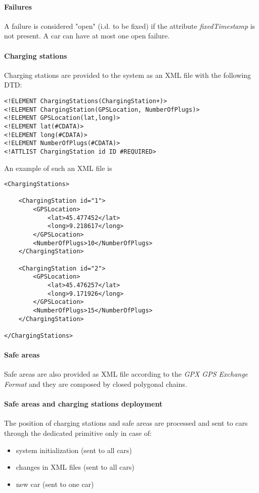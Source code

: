 \paragraph{Failures}A failure is considered "open" (i.d. to be fixed) if the attribute \emph{fixedTimestamp} is not present. A car can have at most one open failure.

\paragraph{Charging stations}Charging stations are provided to the system as an XML file with the following DTD:
\lstset{language=XML,frame=false}
\begin{lstlisting}
<!ELEMENT ChargingStations(ChargingStation+)>
<!ELEMENT ChargingStation(GPSLocation, NumberOfPlugs)>
<!ELEMENT GPSLocation(lat,long)>
<!ELEMENT lat(#CDATA)>
<!ELEMENT long(#CDATA)>
<!ELEMENT NumberOfPlugs(#CDATA)>
<!ATTLIST ChargingStation id ID #REQUIRED>
\end{lstlisting}
An example of such an XML file is 
\begin{lstlisting}
<ChargingStations>

	<ChargingStation id="1">
		<GPSLocation>
			<lat>45.477452</lat>
			<long>9.218617</long>
		</GPSLocation>
		<NumberOfPlugs>10</NumberOfPlugs>
	</ChargingStation>
	
	<ChargingStation id="2">
		<GPSLocation>
			<lat>45.476257</lat>
			<long>9.171926</long>
		</GPSLocation>
		<NumberOfPlugs>15</NumberOfPlugs>
	</ChargingStation>
	
</ChargingStations>
\end{lstlisting}

\clearpage

\paragraph{Safe areas}Safe areas are also provided as XML file according to the \emph{GPX GPS Exchange Format} \cite{gpx} and they are composed by closed polygonal chains.

\paragraph{Safe areas and charging stations deployment}The position of charging stations and safe areas are processed and sent to cars through the dedicated primitive only in case of:
\begin{itemize}
	\item system initialization (sent to all cars)
	\item changes in XML files (sent to all cars)
	\item new car (sent to one car)
\end{itemize}

